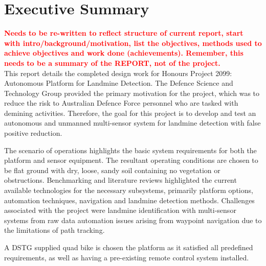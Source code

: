 \documentclass[main.tex]{subfiles}
\begin{document}

{}	%
\chapter*{Executive Summary}

\textcolor{red}{\textbf{Needs to be re-written to reflect structure of current report, start with intro/background/motivation, list the objectives, methods used to achieve objectives and work done (achievements). Remember, this needs to be a summary of the REPORT, not of the project.}}\\

This report details the completed design work for Honours Project 2099: Autonomous Platform for Landmine Detection. The Defence Science and Technology Group provided the primary motivation for the project, which was to reduce the risk to Australian Defence Force personnel who are tasked with demining activities. Therefore, the goal for this project is to develop and test an autonomous and unmanned multi-sensor system for landmine detection with false positive reduction. 

The scenario of operations highlights the basic system requirements for both the platform and sensor equipment. The resultant operating conditions are chosen to be flat ground with dry, loose, sandy soil containing no vegetation or obstructions. Benchmarking and literature reviews highlighted the current available technologies for the necessary subsystems, primarily platform options, automation techniques, navigation and landmine detection methods. Challenges associated with the project were landmine identification with multi-sensor systems from raw data automation issues arising from waypoint navigation due to the limitations of path tracking.  

A DSTG supplied quad bike is chosen the platform as it satisfied all predefined requirements, as well as having a pre-existing remote control system installed.
\end{document}
